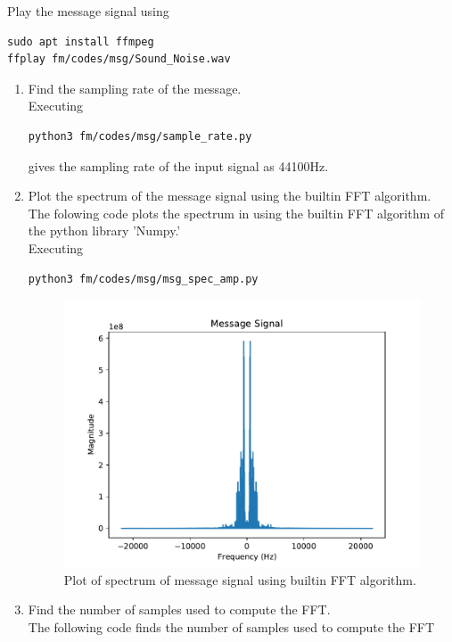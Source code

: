 Play the message signal using
\begin{lstlisting}
sudo apt install ffmpeg
ffplay fm/codes/msg/Sound_Noise.wav
\end{lstlisting}
\begin{enumerate}[label=\arabic*.,ref=\thesection.\theenumi]
\item Find the sampling rate of the message.
\\
	\solution
Executing	
\begin{lstlisting}
python3 fm/codes/msg/sample_rate.py
\end{lstlisting}
gives
the sampling rate of the input signal as 44100Hz.
\item Plot the spectrum of the message signal using the builtin FFT algorithm.\\
	\solution
The folowing code plots the spectrum in  using the builtin FFT algorithm of the python library 'Numpy.'
\\
Executing
\begin{lstlisting}
python3 fm/codes/msg/msg_spec_amp.py
\end{lstlisting}		
\begin{figure}[H]
\centering
\includegraphics[width=\columnwidth]{fm/msg/figs/msg_spec_amp.pdf}
\caption{Plot of spectrum of message signal using builtin FFT algorithm.}
\label{fig:FFTb}
\end{figure}
\item Find the number of samples used to compute the FFT.\\
	\solution
The following code finds the number of samples used to compute the FFT

\end{enumerate}
